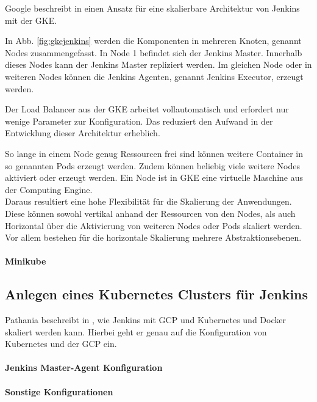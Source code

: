 Google beschreibt in \cite{Google:GKEJenkins} einen Ansatz für eine skalierbare Architektur von Jenkins mit der \ac{GKE}.

In Abb. \ref{fig:gkejenkins} werden die Komponenten in mehreren Knoten, genannt Nodes zusammengefasst. In Node 1 befindet sich der Jenkins Master. Innerhalb dieses Nodes kann der Jenkins Master repliziert werden. Im gleichen Node oder in weiteren Nodes können die Jenkins Agenten, genannt Jenkins Executor, erzeugt werden.

Der Load Balancer aus der \ac{GKE} arbeitet vollautomatisch und erfordert nur wenige Parameter zur Konfiguration. Das reduziert den Aufwand in der Entwicklung dieser Architektur erheblich.

So lange in einem Node genug Ressourcen frei sind können weitere Container in so genannten Pods erzeugt werden. Zudem können beliebig viele weitere Nodes aktiviert oder erzeugt werden. Ein Node ist in \ac{GKE} eine virtuelle Maschine aus der Computing Engine.
\medskip
\\
Daraus resultiert eine hohe Flexibilität für die Skalierung der Anwendungen. Diese können sowohl vertikal anhand der Ressourcen von den Nodes, als auch Horizontal über die Aktivierung von weiteren Nodes oder Pods skaliert werden. Vor allem bestehen für die horizontale Skalierung mehrere Abstraktionsebenen.

\paragraph{Minikube}

\subsection{Anlegen eines Kubernetes Clusters für Jenkins}
Pathania beschreibt in \cite{Pathania2017}, wie Jenkins mit \ac{GCP} und Kubernetes und Docker skaliert werden kann. Hierbei geht er genau auf die Konfiguration von Kubernetes und der \ac{GCP} ein.



\paragraph{Jenkins Master-Agent Konfiguration}


\paragraph{Sonstige Konfigurationen}

